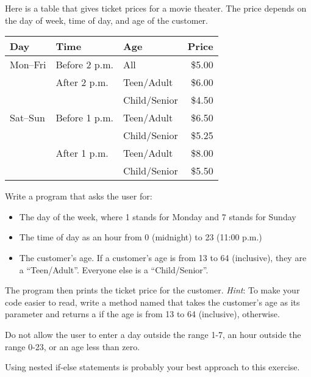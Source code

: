 \begin{exercise}
Here is a table that gives ticket prices for a movie theater. The price depends on the day of week, time of day, and age of the customer.

\renewcommand{\arraystretch}{1.5}  %

\begin{tabular}{|l|l|l|r|}
\hline
Day & Time & Age & Price \\ \hline
Mon--Fri & Before 2 p.m. & All & \$5.00 \\ \cline {2-4}
& After 2 p.m. & Teen/Adult & \$6.00 \\
& & Child/Senior & \$4.50\\ \hline
Sat--Sun & Before 1 p.m. & Teen/Adult & \$6.50 \\
& & Child/Senior & \$5.25 \\ \cline{2-4}
& After 1 p.m. & Teen/Adult & \$8.00 \\
& & Child/Senior & \$5.50 \\ \hline
\end{tabular}

\renewcommand{\arraystretch}{1.0} %

Write a program that asks the user for:
\begin{itemize}
\item The day of the week, where 1 stands for Monday and 7 stands for Sunday
\item The time of day as an hour from 0 (midnight) to 23 (11:00 p.m.)
\item The customer's age. If a customer's age is from 13 to 64 (inclusive), they are a ``Teen/Adult''. Everyone else is a ``Child/Senior''.
\end{itemize}

The program then prints the ticket price for the customer. {\em Hint}: To make your code easier to read, write a method named  that takes the customer's age as its parameter and returns a   if the age is from 13 to 64 (inclusive),  otherwise.

Do not allow the user to enter a day outside the range 1-7, an hour outside the range 0-23, or an age less than zero.

Using nested if-else statements is probably your best approach to this exercise.
\end{exercise}

